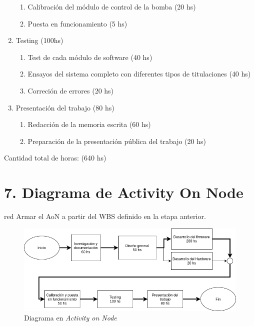 \documentclass[11pt]{charter}
\begin{document}
\begin{enumerate}
\begin{enumerate}
	\item Calibración del módulo de control de la bomba (20 hs)
	\item Puesta en funcionamiento  (5 hs)
	\end{enumerate}
\item Testing (100hs)
	\begin{enumerate}	
	\item Test de cada módulo de software (40 hs)
	\item Ensayos del sistema completo con diferentes tipos de titulaciones (40 hs)
	\item Correción de errores (20 hs)
	\end{enumerate}
\item Presentación del trabajo (80 hs)
	\begin{enumerate}
	\item Redacción de la memoria escrita (60 hs)
	\item Preparación de la presentación pública del trabajo (20 hs)	
	\end{enumerate}
\end{enumerate}

Cantidad total de horas: (640 hs)

\section{7. Diagrama de Activity On Node}
\label{sec:AoN}

\begin{consigna}{red}
Armar el AoN a partir del WBS definido en la etapa anterior. 



\end{consigna}

\begin{figure}[htpb]
\centering 
\includegraphics[width=.8\textwidth]{./Figuras/AoN.png}
\caption{Diagrama en \textit{Activity on Node}}
\label{fig:AoN}
\end{figure}
\end{document}
